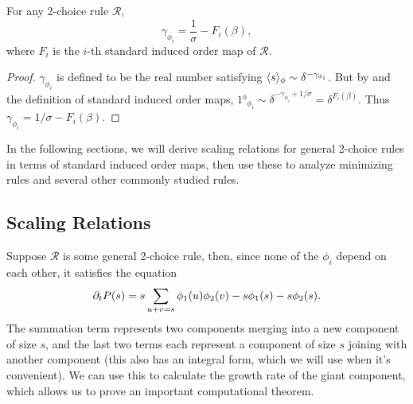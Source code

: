 \documentclass[twoside,10pt]{article}
\begin{document}
\begin{prop}
	\label{exponent-to-induced-map}
	For any 2-choice rule $\mathcal{R}$,
	\[
		\gamma_{\phi_{i}} = \frac{1}{\sigma} - F_{i}(\beta),
	\] where $F_{i}$ is the $i$-th standard induced order map of $\mathcal{R}$.
\end{prop}
\begin{proof}
	$\gamma_{\phi_i}$ is defined to be the real number satisfying $\langle s \rangle_{\phi} \sim \delta^{-\gamma_{\phi_i}}$. But by  and the definition of standard induced order maps, $\ang{1}_{\phi_{i}} \sim \delta^{-\gamma_{\phi_i}+1/\sigma} = \delta^{F_{i}(\beta)}$. Thus $\gamma_{\phi_i} = 1/\sigma - F_{i}(\beta)$.
\end{proof}

In the following sections, we will derive scaling relations for general 2-choice rules in terms of standard induced order maps, then use these to analyze minimizing rules and several other commonly studied rules.


\subsection{Scaling Relations}

Suppose $\mathcal{R}$ is some general 2-choice rule, then, since none of the $\phi_i$ depend on each other, it satisfies the equation
	\begin{equation}
		\label{smoluchowski}
                \partial_{t}{P(s)} = s \sum_{u+v=s} \phi_1(u) \phi_2(v) - s \phi_1(s) - s\phi_2(s).
	\end{equation}
	The summation term represents two components merging into a new component of size $s$, and the last two terms each represent a component of size $s$ joining with another component (this also has an integral form, which we will use when it's convenient). We can use this to calculate the growth rate of the giant component, which allows us to prove an important computational theorem.
\end{document}
